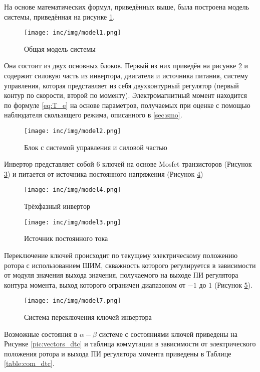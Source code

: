 На основе математических формул, приведённых выше, была построена модель системы, приведённая на рисунке \ref{pic:mod1}.

\begin{figure}[!h]
\centering
\texttt{[image: inc/img/model1.png]}
\caption{Общая модель системы}
\label{pic:mod1}
\end{figure}

Она состоит из двух основных блоков. Первый из них приведён на рисунке \ref{pic:mod2} и содержит силовую часть из инвертора, двигателя и источника питания, систему управления, которая представляет из себя двухконтурный регулятор (первый контур по скорости, второй по моменту). Электромагнитный момент находится по формуле \ref{eq:T_e} на основе параметров, получаемых при оценке с помощью наблюдателя скользящего режима, описанного в \ref{sec:smo}.

\begin{figure}[!h]
\centering
\texttt{[image: inc/img/model2.png]}
\caption{Блок с системой управления и силовой частью}
\label{pic:mod2}
\end{figure}

Инвертор представляет собой 6 ключей на основе Mosfet транзисторов (Рисунок \ref{pic:mod4}) и питается от источника постоянного напряжения (Рисунок \ref{pic:mod3})

\begin{figure}[!h]
\centering
\texttt{[image: inc/img/model4.png]}
\caption{Трёхфазный инвертор}
\label{pic:mod4}
\end{figure}

\begin{figure}[!h]
\centering
\texttt{[image: inc/img/model3.png]}
\caption{Источник постоянного тока}
\label{pic:mod3}
\end{figure}

Переключение ключей происходит по текущему электрическому положению ротора с использованием ШИМ, скважность которого регулируется в зависимости от модуля значения выхода значения, получаемого на выходе ПИ регулятора контура момента, выход которого ограничен диапазоном от $-1$ до $1$ (Рисунок \ref{pic:mod7}).

\begin{figure}[!h]
\centering
\texttt{[image: inc/img/model7.png]}
\caption{Система переключения ключей инвертора}
\label{pic:mod7}
\end{figure}

Возможные состояния в $\alpha-\beta$ системе с состояниями ключей приведены на Рисунке \ref{pic:vectors_dtc} и таблица коммутации в зависимости от электрического положения ротора и выхода ПИ регулятора момента приведены в Таблице \ref{table:com_dtc}.


